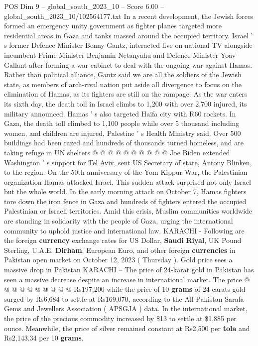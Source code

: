 \begin{textsample}{POS Dim 9 – global\_south\_2023\_10 – Score 6.00 – global\_south\_2023\_10/102564177.txt}  \label{ex:f9_pos_080}
In a recent development, the Jewish forces formed an emergency unity government as fighter planes targeted more residential areas in Gaza and tanks massed around the occupied territory.
Israel ' s former Defence Minister Benny Gantz, interacted live on national TV alongside incumbent Prime Minister Benjamin Netanyahu and Defence Minister Yoav Gallant after forming a war cabinet to deal with the ongoing war against Hamas.
Rather than political alliance, Gantz said we are all the soldiers of the Jewish state, as members of arch-rival nation put aside all divergence to focus on the elimination of Hamas, as its fighters are still on the rampage.
As the war enters its sixth day, the death toll in Israel climbs to 1,200 with over 2,700 injured, its military announced.
Hamas ' s also targeted Haifa city with R60 rockets.
In Gaza, the death toll climbed to 1,100 people while over 5 thousand including women, and children are injured, Palestine ' s Health Ministry said.
Over 500 buildings had been razed and hundreds of thousands turned homeless, and are taking refuge in UN shelters @ @ @ @ @ @ @ @ @ @ Joe Biden extended Washington ' s support for Tel Aviv, sent US Secretary of state, Antony Blinken, to the region.
On the 50th anniversary of the Yom Kippur War, the Palestinian organization Hamas attacked Israel.
This sudden attack surprised not only Israel but the whole world.
In the early morning attack on October 7, Hamas fighters tore down the iron fence in Gaza and hundreds of fighters entered the occupied Palestinian or Israeli territories.
Amid this crisis, Muslim communities worldwide are standing in solidarity with the people of Gaza, urging the international community to uphold justice and international law.
KARACHI - Following are the foreign \textbf{currency} exchange rates for US Dollar, \textbf{Saudi} \textbf{Riyal}, UK Pound Sterling, U.A.E. \textbf{Dirham}, European Euro, and other foreign \textbf{currencies} in Pakistan open market on October 12, 2023 ( Thursday ).
Gold price sees a massive drop in Pakistan KARACHI -- The price of 24-karat gold in Pakistan has seen a massive decrease despite an increase in international market.
The price @ @ @ @ @ @ @ @ @ @ Rs197,200 while the price of 10 \textbf{grams} of 24 carats gold surged by Rs6,684 to settle at Rs169,070, according to the All-Pakistan Sarafa Gems and Jewellers Association ( APSGJA ) data.
In the international market, the price of the precious commodity increased by \$13 to settle at \$1,885 per ounce.
Meanwhile, the price of silver remained constant at Rs2,500 per \textbf{tola} and Rs2,143.34 per 10 \textbf{grams}.

\end{textsample}
